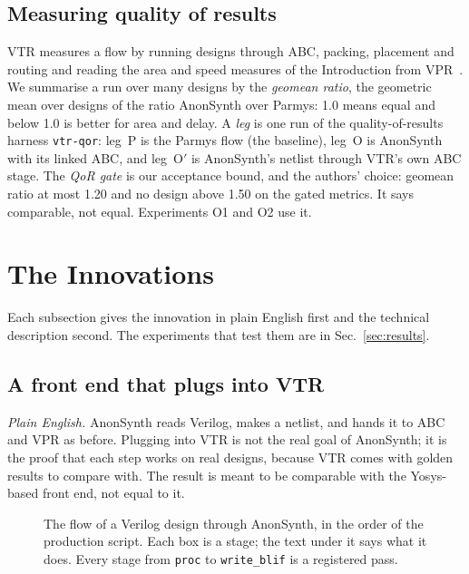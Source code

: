 \documentclass[conference]{IEEEtran}
\newcommand{\code}[1]{\texttt{#1}}
\begin{document}
\subsection{Measuring quality of results}

VTR measures a flow by running designs through ABC, packing, placement and routing and reading the area and speed measures of the Introduction from VPR~\cite{anon11,luu2014vtr7,murray2020vtr8}. We summarise a run over many designs by the \emph{geomean ratio}, the geometric mean over designs of the ratio AnonSynth over Parmys: 1.0 means equal and below 1.0 is better for area and delay. %
A \emph{leg} is one run of the quality-of-results harness \code{vtr-qor}: leg~P is the Parmys flow (the baseline), leg~O is AnonSynth with its linked ABC, and leg~O$'$ is AnonSynth's netlist through VTR's own ABC stage. %
The \emph{QoR gate} is our acceptance bound, and the authors' choice: geomean ratio at most 1.20 and no design above 1.50 on the gated metrics. It says comparable, not equal. %
Experiments O1 and O2 use it.

\section{The Innovations}
\label{sec:arch}

Each subsection gives the innovation in plain English first and the technical description second. The experiments that test them are in Sec.~\ref{sec:results}.

\subsection{A front end that plugs into VTR}
\label{sec:vtr-link}

\emph{Plain English.} AnonSynth reads Verilog, makes a netlist, and hands it to ABC and VPR as before. Plugging into VTR is not the real goal of AnonSynth; it is the proof that each step works on real designs, because VTR comes with golden results to compare with. The result is meant to be comparable with the Yosys-based front end, not equal to it.

\begin{figure}[t]
\centering
\odinfit{\textwidth}{}
\caption{The flow of a Verilog design through AnonSynth, in the order of the production script. Each box is a stage; the text under it says what it does. Every stage from \code{proc} to \code{write\_blif} is a registered pass.}
\label{fig:flow}
\end{figure}
\end{document}
